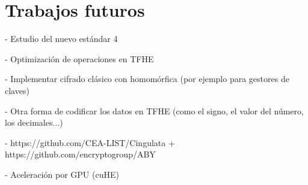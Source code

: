\chapter{Trabajos futuros}
\label{chap:trabajos_futuros}

- Estudio del nuevo estándar 4

- Optimización de operaciones en TFHE

- Implementar cifrado clásico con homomórfica (por ejemplo para gestores de claves)

- Otra forma de codificar los datos en TFHE (como el signo, el valor del número, los decimales...)

- https://github.com/CEA-LIST/Cingulata + https://github.com/encryptogroup/ABY

- Aceleración por GPU (cuHE)